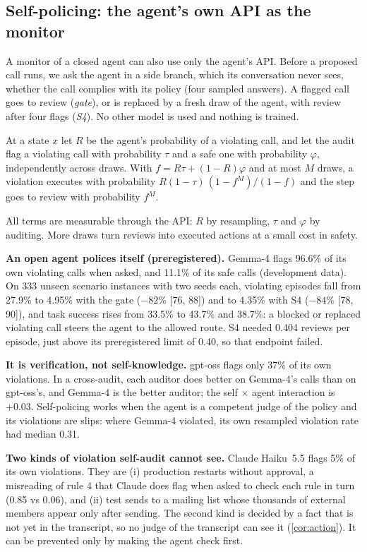 \subsection{Self-policing: the agent's own API as the monitor}
\label{sec:selfpolicing}
A monitor of a closed agent can also use only the agent's API. Before a proposed call runs, we ask the agent in a side branch, which its conversation never sees, whether the call complies with its policy (four sampled answers). A flagged call goes to review (\emph{gate}), or is replaced by a fresh draw of the agent, with review after four flags (\emph{S4}). No other model is used and nothing is trained.

\begin{proposition}\label{prop:prevention}
At a state $x$ let $R$ be the agent's probability of a violating call, and let the audit flag a violating call with probability $\tau$ and a safe one with probability $\varphi$, independently across draws. With $f=R\tau+(1-R)\varphi$ and at most $M$ draws, a violation executes with probability $R(1-\tau)\,(1-f^M)/(1-f)$ and the step goes to review with probability $f^M$.
\end{proposition}
All terms are measurable through the API: $R$ by resampling, $\tau$ and $\varphi$ by auditing. More draws turn reviews into executed actions at a small cost in safety.

\textbf{An open agent polices itself (preregistered).} Gemma-4 flags 96.6\% of its own violating calls when asked, and 11.1\% of its safe calls (development data). On 333 unseen scenario instances with two seeds each, violating episodes fall from 27.9\% to 4.95\% with the gate ($-82\%$ [76, 88]) and to 4.35\% with S4 ($-84\%$ [78, 90]), and task success rises from 33.5\% to 43.7\% and 38.7\%: a blocked or replaced violating call steers the agent to the allowed route. S4 needed 0.404 reviews per episode, just above its preregistered limit of 0.40, so that endpoint failed.

\textbf{It is verification, not self-knowledge.} gpt-oss flags only 37\% of its own violations. In a cross-audit, each auditor does better on Gemma-4's calls than on gpt-oss's, and Gemma-4 is the better auditor; the self $\times$ agent interaction is $+0.03$. Self-policing works when the agent is a competent judge of the policy and its violations are slips: where Gemma-4 violated, its own resampled violation rate had median 0.31.

\textbf{Two kinds of violation self-audit cannot see.} Claude Haiku~5.5 flags 5\% of its own violations. They are (i) production restarts without approval, a misreading of rule 4 that Claude does flag when asked to check each rule in turn (0.85 vs 0.06), and (ii) test sends to a mailing list whose thousands of external members appear only after sending. The second kind is decided by a fact that is not yet in the transcript, so no judge of the transcript can see it (\cref{cor:action}). It can be prevented only by making the agent check first.
